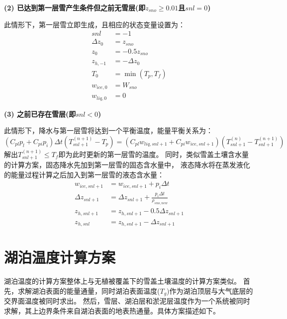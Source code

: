 \noindent\textbf {(2) 已达到第一层雪产生条件但之前无雪层(即$z_{sno}\geqslant 0.01$且$snl=0$)}

此情形下，第一层雪立即生成，且相应的状态变量设置为：
\begin{equation}
\begin{aligned}
    snl &= -1 \\
    \Delta z_{0} &= z_{sno} \\
    z_{0} &= -0.5 z_{sno} \\
    z_{h,-1} &= -\Delta z_{0} \\
    T_{0} &= \min \left(T_{p}, T_{f}\right) \\
    w_{ice, 0} &= W_{sno} \\
    w_{liq, 0} &= 0
\end{aligned}
\end{equation}


\noindent\textbf {(3) 之前已存在雪层(即$snl<0$)}

此情形下，降水与第一层雪将达到一个平衡温度，能量平衡关系为：
\begin{equation}
\left(C_{pl} p_{l}+C_{pi} p_{i}\right) \Delta t\left(T_{snl+1}^{(n+1)}-T_{p}\right)=
\left(C_{pl} w_{liq, snl+1}+C_{p i} w_{ice, snl+1}\right)\left(T_{snl+1}^{(n)}-T_{snl+1}^{(n+1)}\right)
\end{equation}
解出$T_{snl+1}^{\left(n+1\right)}\leqslant T_f$即为此时更新的第一层雪的温度。
同时，类似雪盖土壤含水量的计算方案，固态降水先加到第一层雪的固态含水量中，
液态降水将在蒸发液化的能量过程计算之后加入到第一层雪的液态含水量：
\begin{equation}
\begin{aligned}
    w_{ice, snl+1} &=  w_{ice, snl+1}+p_{i} \Delta t \\
    \Delta z_{snl+1} &= \Delta z_{snl+1}+\frac{p_{i} \Delta t}{\rho_{sno,new}} \\
    z_{h, snl+1} &= z_ {h, snl+1}-0.5 \Delta z_{snl+1} \\ 
    z_{h, snl} &= z_{h, snl+1}-\Delta z_{snl+1}
\end{aligned}
\end{equation}


\section{湖泊温度计算方案}
湖泊温度的计算方案整体上与无植被覆盖下的雪盖土壤温度的计算方案类似。
首先，求解湖泊表面的能量通量，同时湖泊表面温度($T_g$)作为湖泊顶层与大气底层的交界面温度被同时求出。
然后，雪层、湖泊层和淤泥层温度作为一个系统被同时求解，其上边界条件来自湖泊表面的地表热通量。具体方案描述如下。

